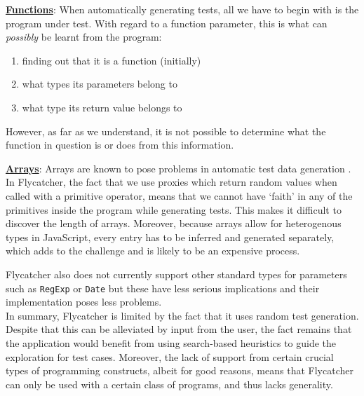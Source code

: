 \textbf{\underline{Functions}}: When automatically generating tests, all we have to begin with is the program under test. With regard to a function parameter, this is what can \emph{possibly} be learnt from the program:

\begin{enumerate}
   \item finding out that it is a function (initially)
   \item what types its parameters belong to
   \item what type its return value belongs to
\end{enumerate}

However, as far as we understand, it is not possible to determine what the function in question is or does from this information.

\textbf{\underline{Arrays}}: Arrays are known to pose problems in automatic test data generation \cite{tahbildar2automated}. In \textsf{Flycatcher}, the fact that we use proxies which return random values when called with a primitive operator, means that we cannot have `faith' in any of the primitives inside the program while generating tests. This makes it difficult to discover the length of arrays. Moreover, because arrays allow for heterogenous types in JavaScript, every entry has to be inferred and generated separately, which adds to the challenge and is likely to be an expensive process.

\textsf{Flycatcher} also does not currently support other standard types for parameters such as \texttt{RegExp} or \texttt{Date} but these have less serious implications and their implementation poses less problems.\\

In summary, \textsf{Flycatcher} is limited by the fact that it uses random test generation. Despite that this can be alleviated by input from the user, the fact remains that the application would benefit from using search-based heuristics to guide the exploration for test cases. Moreover, the lack of support from certain crucial types of programming constructs, albeit for good reasons, means that \textsf{Flycatcher} can only be used with a certain class of programs, and thus lacks generality.

